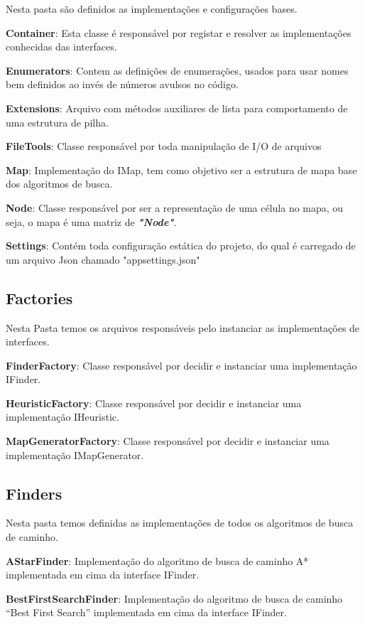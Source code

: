  Nesta pasta são definidos as implementações e configurações bases.
 
 \textbf{Container}: Esta classe é responsável por registar e resolver as implementações conhecidas das interfaces.
 
 \textbf{Enumerators}: Contem as definições de enumerações, usados para usar nomes bem definidos ao invés de números avulsos no código.
 
 \textbf{Extensions}: Arquivo com métodos auxiliares de lista para comportamento de uma estrutura de pilha.
 
 \textbf{FileTools}: Classe responsável por toda manipulação de I/O de arquivos
 
 \textbf{Map}: Implementação do IMap, tem como objetivo ser a estrutura de mapa base dos algoritmos de busca.
 
 \textbf{Node}: Classe responsável por ser a representação de uma célula no mapa, ou seja, o mapa é uma matriz de \textbf{\textit{"Node"}}.
 
 \textbf{Settings}: Contém toda configuração estática do projeto, do qual é carregado de um arquivo Json chamado "appsettings.json"
 
 \subsection{Factories}
 
 Nesta Pasta temos os arquivos responsáveis pelo instanciar as implementações de interfaces.
 
 \textbf{FinderFactory}: Classe responsável por decidir e instanciar uma implementação IFinder.
 
 \textbf{HeuristicFactory}: Classe responsável por decidir e instanciar uma implementação IHeuristic.
 
 \textbf{MapGeneratorFactory}: Classe responsável por decidir e instanciar uma implementação IMapGenerator.
 
 \subsection{Finders}
 
 Nesta pasta temos definidas as implementações de todos os algoritmos de busca de caminho.
 
 \textbf{AStarFinder}: Implementação do algoritmo de busca de caminho A* implementada em cima da interface IFinder.
 
 \textbf{BestFirstSearchFinder}: Implementação do algoritmo de busca de caminho “Best First Search” implementada em cima da interface IFinder.
 
